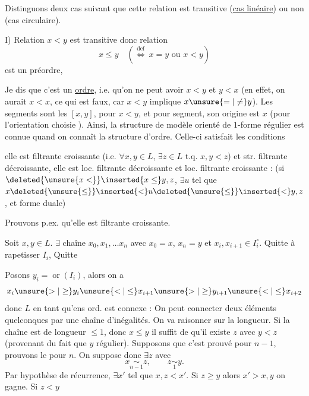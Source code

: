 Distinguons deux cas suivant que cette relation est transitive (\uline{cas linéaire}) ou non (cas circulaire).

I) Relation $x<y$ est transitive donc relation
\[
x\leq y\quad(\overset{\mathrm{def}}{\Longleftrightarrow}\ x=y\text{ ou }x<y)
\]
est un préordre,




Je dis que c'est un \uline{ordre}, i.e. qu'on ne peut avoir $x<y$ et $y<x$ (en effet, on aurait $x<x$, ce qui est faux, car $x<y$ implique $x\unsure{=|\ne}y$). Les segments sont les $[x,y]$, pour $x<y$, et pour   segment, son origine est $x$ (pour l'orientation choisie ). Ainsi, la structure de modèle  orienté de $1$-forme régulier est connue quand on connaît la structure d'ordre. Celle-ci  satisfait les conditions

elle est  filtrante croissante (i.e. $\forall x,y\in L$, $\exists z\in L$ t.q. $x,y<z$) et str. filtrante décroissante, elle est  loc. filtrante décroissante et loc. filtrante  croissante : (si $\deleted{\unsure{x<}}\inserted{x\leq}y,z$, $\exists u$ tel que $x\deleted{\unsure{\leq}}\inserted{<}u\deleted{\unsure{\leq}}\inserted{<}y,z$, et forme duale)



Prouvons p.ex. qu'elle est  filtrante croissante.




Soit $x,y\in L$. $\exists$ chaîne $x_0,x_1,\ldots x_n$ avec $x_0=x$, $x_n=y$ et $x_i,x_{i+1}\in I_i^\circ$.  Quitte à rapetisser $I_i$,  Quitte

Posons $y_i=\operatorname{or}(I_i)$, alors on a
\[
x_i\unsure{>|\geq}y_i\unsure{<|\leq}x_{i+1}
\unsure{>|\geq}y_{i+1}\unsure{<|\leq}x_{i+2}
\]
donc $L$ en tant qu'ens ord. est connexe : On peut connecter deux éléments quelconques par une chaîne d'inégalités. On va raisonner sur la longueur. Si la chaîne est de longueur $\leq1$, donc $x\leq y$ il suffit de   qu'il existe $z$ avec $y<z$ (provenant du fait que $y$ régulier). Supposons que c'est prouvé pour $n-1$,  prouvons le pour $n$.  On suppose donc $\exists z$ avec
\[
x\underset{n-1}{\sim}z,\qquad z\underset{1}{\sim}y.
\]
Par hypothèse de récurrence, $\exists x'$ tel que  $x,z<x'$. Si $z\geq y$ alors $x'>x,y$ on gagne. Si $z<y$ 

